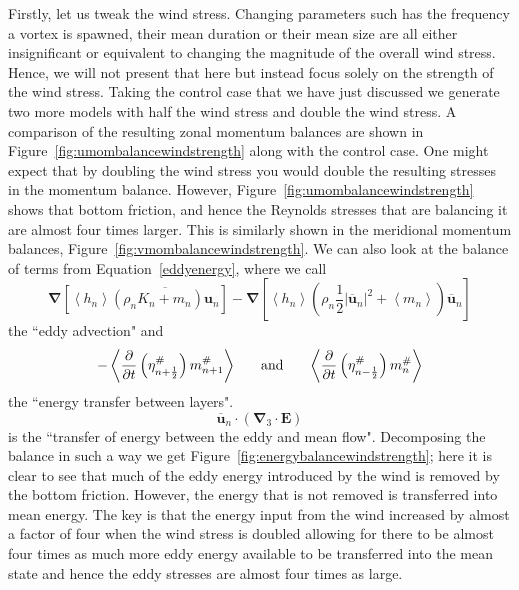 \documentclass[12pt,a4paper]{report}
\newcommand*\thkmean[1]{\overline{#1}}
\newcommand*\nthkmean[1]{\left\langle{#1}\right\rangle}
\newcommand*\nthkres[1]{{#1}^{\#}}
\newcommand*\figref[1]{Figure~\ref{#1}}
\newcommand*\equref[1]{Equation~\eqref{#1}}
\newcommand*{\half}{\frac{1}{2}}
\begin{document}
 	Firstly, let us tweak the wind stress. Changing parameters such has the 
 	frequency a vortex is spawned, their mean duration or their mean size are all
 	either insignificant or equivalent to changing the magnitude of the overall
 	wind stress. Hence, we will not present that here but instead focus solely on the
 	strength of the wind stress. Taking the control case that we have just discussed
 	we generate two more models with half the wind stress and double the wind stress.
 	A comparison of the resulting zonal momentum balances are shown in \figref{fig:umombalancewindstrength} along with the control case. One might
 	expect that by doubling the wind stress you would double the resulting 
 	stresses in the momentum balance. However, \figref{fig:umombalancewindstrength}
 	shows that bottom friction, and hence the Reynolds stresses that are balancing it
 	are almost four times larger. This is similarly shown in the meridional momentum
 	balances, \figref{fig:vmombalancewindstrength}. We can also look at the balance
 	of terms from \equref{eddyenergy}, where we call
 	\begin{equation*}
 	\boldsymbol{\nabla} \left[\nthkmean{h_{n}} \thkmean{\left(\rho_{n}K_{n}+m_{n}\right) \boldsymbol{u}_{n}}\right] -\boldsymbol{\nabla} \left[\nthkmean{h_{n}} \left(\rho_{n}\half \left|\thkmean{\boldsymbol{u}}_{n}\right|^{2}+\nthkmean{m_{n}}\right) \thkmean{\boldsymbol{u}}_{n}\right]
 	\end{equation*}
 	the ``eddy advection" and
 	\begin{equation*}
 	- \nthkmean{\frac{\partial}{\partial t}\left(\nthkres{\eta}_{n+\half }\right)   \nthkres{m}_{n+1}}
 	\mbox{\hspace{5mm} and \hspace{5mm}} \nthkmean{\frac{\partial}{\partial t}\left(\nthkres{\eta}_{n-\half }\right) \nthkres{m}_{n}}
 	\end{equation*}
 	the ``energy transfer between layers". 
 	\begin{equation*}
 	\thkmean{\boldsymbol{u}}_{n} \cdot \left(\boldsymbol{\nabla}_{3}\cdot \boldsymbol{E}\right)
 	\end{equation*}
 	is the ``transfer of energy between the eddy and mean flow".
 	Decomposing the balance in such a way
 	 we get \figref{fig:energybalancewindstrength}; here it is
 	clear to see that much of the eddy energy introduced by the wind
 	is removed by the bottom friction. However, the energy that is not 
 	removed is transferred into mean energy. The key is that the energy
 	input from the wind increased by almost a factor of four when the wind
 	stress is doubled allowing for there to be
 	almost four times as much more eddy energy available to be transferred into the
 	mean state and hence the eddy stresses are  almost four times as large.
\end{document}
